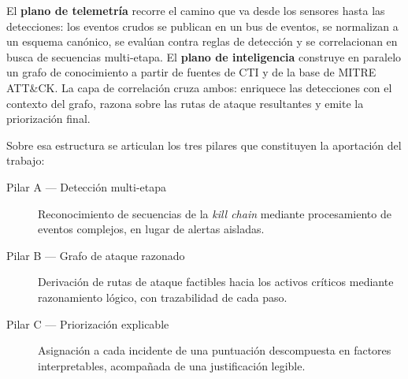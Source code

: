 El \textbf{plano de telemetría} recorre el camino que va desde los sensores hasta las
detecciones: los eventos crudos se publican en un bus de eventos, se normalizan a un esquema
canónico, se evalúan contra reglas de detección y se correlacionan en busca de secuencias
multi-etapa. El \textbf{plano de inteligencia} construye en paralelo un grafo de conocimiento
a partir de fuentes de CTI y de la base de MITRE ATT\&CK. La capa de correlación cruza ambos:
enriquece las detecciones con el contexto del grafo, razona sobre las rutas de ataque
resultantes y emite la priorización final.

Sobre esa estructura se articulan los tres pilares que constituyen la aportación del trabajo:

\begin{description}
    \item[Pilar A --- Detección multi-etapa] Reconocimiento de secuencias de la
    \textit{kill chain} mediante procesamiento de eventos complejos, en lugar de alertas
    aisladas.
    \item[Pilar B --- Grafo de ataque razonado] Derivación de rutas de ataque factibles hacia
    los activos críticos mediante razonamiento lógico, con trazabilidad de cada paso.
    \item[Pilar C --- Priorización explicable] Asignación a cada incidente de una puntuación
    descompuesta en factores interpretables, acompañada de una justificación legible.
\end{description}

